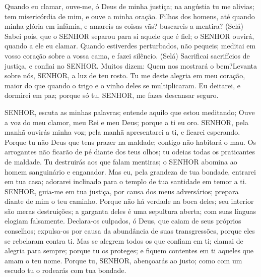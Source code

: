 
{\PP 
  Quando eu clamar, ouve-me, ó Deus de minha justiça; na angústia tu me alivias; tem misericórdia de mim, e ouve a minha oração.
  Filhos dos homens, até quando
{} minha glória em infâmia, e amareis as coisas vãs?
{} buscareis a mentira? (Selá)
  Sabei pois, que o SENHOR separou para si aquele que é fiel; o SENHOR ouvirá, quando a ele eu clamar.
  Quando estiverdes perturbados,
 não pequeis; meditai em vosso coração sobre a vossa cama, e fazei silêncio. (Selá)
  Sacrificai sacrifícios de justiça, e confiai no SENHOR.
  Muitos dizem: Quem nos mostrará o bem?Levanta sobre nós, SENHOR, a luz de teu rosto.
  Tu me deste alegria em meu coração, maior do que quando o trigo e o vinho deles se multiplicaram.
  Eu deitarei, e dormirei em paz; porque só tu, SENHOR, me fazes descansar seguro.
\par }


{\PP 
  SENHOR, escuta as minhas palavras; entende aquilo que estou meditando;
  Ouve a voz do meu clamor, meu Rei e meu Deus; porque a ti eu oro.
  SENHOR, pela manhã ouvirás minha voz; pela manhã apresentarei
{} a ti, e ficarei esperando.
  Porque tu não
{} Deus que tens prazer na maldade; contigo não habitará o mau.
  Os arrogantes não ficarão de pé diante dos teus olhos; tu odeias todas os praticantes de maldade.
  Tu destruirás aos que falam mentiras; o SENHOR abomina ao homem sanguinário e enganador.
  Mas eu, pela grandeza de tua bondade, entrarei em tua casa; adorarei inclinado para o templo de tua santidade em temor a ti.
  SENHOR, guia-me em tua justiça, por causa dos meus adversários; prepara diante de mim o teu caminho.
  Porque não há verdade na boca deles; seu interior são meras destruições; a garganta deles é uma sepultura aberta; com suas línguas elogiam falsamente.
  Declara-os culpados, ó Deus,
{} que caiam de seus próprios conselhos; expulsa-os por causa da abundância de suas transgressões, porque eles se rebelaram contra ti.
  Mas se alegrem todos os que confiam em ti; clamai de alegria para sempre; porque tu os proteges; e fiquem contentes em ti aqueles que amam o teu nome.
  Porque tu, SENHOR, abençoarás ao justo; como com um escudo tu o rodearás com tua bondade.
\par }

